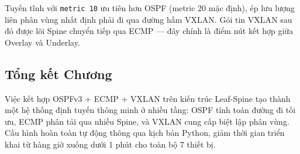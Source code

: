Tuyến tĩnh với \texttt{metric 10} ưu tiên hơn OSPF (metric 20 mặc định), ép lưu lượng liên phân vùng nhất định phải đi qua đường hầm VXLAN. Gói tin VXLAN sau đó được lõi Spine chuyển tiếp qua ECMP — đây chính là điểm nút kết hợp giữa Overlay và Underlay.

\subsection{Tổng kết Chương}

Việc kết hợp OSPFv3 + ECMP + VXLAN trên kiến trúc Leaf-Spine tạo thành một hệ thống định tuyến thông minh ở nhiều tầng: OSPF tính toán đường đi tối ưu, ECMP phân tải qua nhiều Spine, và VXLAN cung cấp biệt lập phân vùng. Cấu hình hoàn toàn tự động thông qua kịch bản Python, giảm thời gian triển khai từ hàng giờ xuống dưới 1 phút cho toàn bộ 7 thiết bị.
